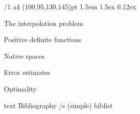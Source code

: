 \useOpTeX  %


\hyperlinks \Black \Black
{}

\enlang
\fontfam[EBGaramond]

\margins/1 a4 (100,95,130,145)pt
\typosize[12.21/14.5]
\parindent 1.5em
\parskip 1.5ex
 0.12ex


\tocpage


\sec The interpolation problem


\sec Positive definite functions


\sec Native spaces


\sec Error estimates


\sec Optimality










\let\_mtext\ignoreit
\nonum\chap Bibliography
\def\_opwarning#1{}
\usebib/s (simple) biblist


\bye
